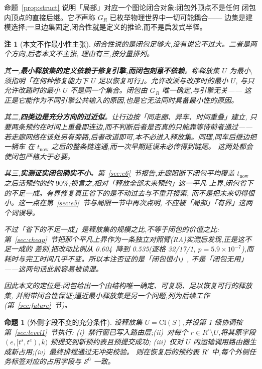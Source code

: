 \documentclass[manuscript,screen,review]{acmart}
\newcommand{\ResFracCheapRtwo}{0.535}
\newcommand{\ResFracAllFuture}{0.604}
\newcommand{\RAStabWTL}{32/17/1}     %
\newcommand{\RAStabP}{5.9\times10^{-7}}  %
\newtheorem{remark}{注}
\newtheorem{prop}{命题}
\begin{document}
命题~\ref{prop:struct} 说明「局部」对应一个图论闭合对象:闭包外顶点不是任何
闭包内顶点的直接后继。它\emph{不}声称 \(G_R\) 已枚举物理世界中一切可能耦合——
边集是建模选择;一旦边集固定,闭合性就是定义的推论,而不是启发式半径。

\begin{remark}[本文不作最小性主张]
\label{rem:minimality}
闭合性说的是闭包\emph{足够大},没有说它\emph{不过大}。二者是两个方向,后者本文不主张,
理由有三,按分量排列。

其一,\textbf{最小释放集的定义依赖于修复引擎,而闭包刻意不依赖}。称释放集 \(U\) 为最小,
须指明「在何种修复能力下 \(U\) 足以恢复可行」。允许改派与改序时的最小 \(U\),
与只允许改路时的最小 \(U\) 不是同一个集合。闭包由 \(G_R\) 唯一确定,与引擎无关——
这正是它能作为不同引擎公共输入的原因,也是它无法同时具备最小性的原因。

其二,\textbf{四类边是充分方向的过近似}。让行边按「同走廊、异车、时间重叠」建立,
只要两条预约在时间上重叠即连边,而不判断后者是否\emph{真的}只能靠等待前者通过——
若走廊网络在该处另有旁路,后者改道即可,本不必进入释放集。同理,同车后继边把一辆车
在 \(t_{\mathrm{now}}\) 之后的整条链连通,而一次早期延误未必传得到链尾。
这两处都会使闭包严格大于必要。

其三,\textbf{实测证实闭包确实不小}。第~\ref{sec:e6}~节报告,走廊阻断下闭包平均覆盖
\(t_{\mathrm{now}}\) 之后活预约的约 \(90\%\);换言之,相对「释放全部未来预约」这一平凡
上界,闭包省下的不足一成。有界修复真正省下的是\emph{不动过去}与\emph{不重开搜索},
而不是把未来切得很小。这一点在第~\ref{sec:e5}~节与局限一节中再次点明,
不应被「局部」「有界」这两个词误导。

不过「省下的不足一成」是释放集的\emph{规模}之比,不等于闭包的价值之比:
第~\ref{sec:cheap}~节把那个平凡上界作为一条独立对照臂(RA)实测后发现,正是这不足一成的
差别,把改动比例从 \ResFracAllFuture\ 降到 \ResFracCheapRtwo(逐格 \RAStabWTL,
\(p=\RAStabP\)),而耗时与完工时间几乎不变。所以本注否证的是「闭包很小」,
不是「闭包无用」——这两句话此前容易被读混。

因此本文的定位是:闭包给出一个由结构唯一确定、可复现、\emph{足以}恢复可行的释放集,
并附带闭合性保证;逼近最小释放集是另一个问题,列为后续工作
(第~\ref{sec:future}~节)。
\end{remark}

\begin{prop}[外侧字段不变的充分条件]
\label{prop:outside}
设释放集 \(U=\mathrm{Cl}(S)\),并设第 1 级协调按第~\ref{sec:level1}~节执行:
(i)~禁行窗已写入路由层;(ii)~对每个 \(r\in R^{\circ}\setminus U\),将其原字段
\((e,[t^s,t^e),k)\) 预提交到新预约表且预提交成功;
(iii)~仅对 \(U\) 内运输调用路由器生成新占用;(iv)~最终排程通过无冲突校验。
则在恢复后的预约表 \(R'\) 中,每个外侧任务标签对应的占用字段与 \(\mathcal{S}^0\) 一致。
\end{prop}
\end{document}
